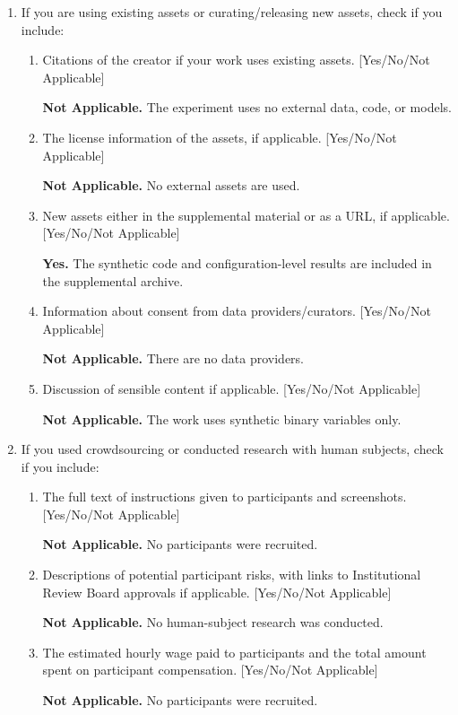 \begin{enumerate}[leftmargin=*]
\item If you are using existing assets or curating/releasing new assets, check if you include:
  \begin{enumerate}
  \item Citations of the creator if your work uses existing assets. [Yes/No/Not Applicable]

  \textbf{Not Applicable.} The experiment uses no external data, code, or models.

  \item The license information of the assets, if applicable. [Yes/No/Not Applicable]

  \textbf{Not Applicable.} No external assets are used.

  \item New assets either in the supplemental material or as a URL, if applicable. [Yes/No/Not Applicable]

  \textbf{Yes.} The synthetic code and configuration-level results are included in the supplemental archive.

  \item Information about consent from data providers/curators. [Yes/No/Not Applicable]

  \textbf{Not Applicable.} There are no data providers.

  \item Discussion of sensible content if applicable. [Yes/No/Not Applicable]

  \textbf{Not Applicable.} The work uses synthetic binary variables only.
  \end{enumerate}

\item If you used crowdsourcing or conducted research with human subjects, check if you include:
  \begin{enumerate}
  \item The full text of instructions given to participants and screenshots. [Yes/No/Not Applicable]

  \textbf{Not Applicable.} No participants were recruited.

  \item Descriptions of potential participant risks, with links to Institutional Review Board approvals if applicable. [Yes/No/Not Applicable]

  \textbf{Not Applicable.} No human-subject research was conducted.

  \item The estimated hourly wage paid to participants and the total amount spent on participant compensation. [Yes/No/Not Applicable]

  \textbf{Not Applicable.} No participants were recruited.
  \end{enumerate}

\end{enumerate}
\endgroup
